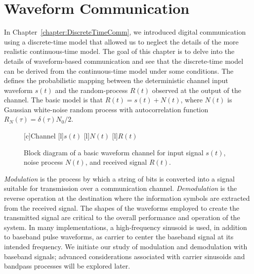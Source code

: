 \chapter{Waveform Communication}
\label{chapter:ContinuousTimeComm}

In Chapter~\ref{chapter:DiscreteTimeComm}, we introduced digital communication using a discrete-time model that allowed us to neglect the details of the more realistic continuous-time model.
The goal of this chapter is to delve into the details of waveform-based communication and see that the discrete-time model can be derived from the continuous-time model under some conditions.
The  defines the probabilistic mapping between the deterministic channel input waveform $s(t)$ and the random-process $R(t)$ observed at the output of the channel.
The basic model is that $R(t) = s(t) + N(t)$, where $N(t)$ is Gaussian white-noise random process with autocorrelation function $R_N (\tau) = \delta(\tau) N_0 / 2$.

\begin{figure}
\begin{center}
\begin{psfrags}
[c]{Channel}
[l]{$s(t)$}
[l]{$N(t)$}
[l]{$R(t)$}
\end{psfrags}
\end{center}
\caption{Block diagram of a basic waveform channel for input signal $s(t)$, noise process $N(t)$, and received signal $R(t)$.}
\end{figure}

\iffalse
\emph{Modulation} is the process by which a string of bits is converted into a signal suitable for transmission over a communication channel.
\emph{Demodulation} is the reverse operation at the destination where the information symbols are extracted from the received signal.
The shapes of the waveforms employed to create the transmitted signal are critical to the overall performance and operation of the system.
In many implementations, a high-frequency sinusoid is used, in addition to baseband pulse waveforms, as carrier to center the baseband signal at its intended frequency.
We initiate our study of modulation and demodulation with baseband signals; advanced considerations associated with carrier sinusoids and bandpass processes will be explored later.


